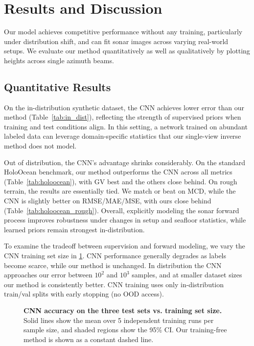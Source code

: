 \section{Results and Discussion}
\label{sec:results}

Our model achieves {competitive} performance without any training, {particularly under distribution shift}, and can fit sonar images across varying real-world setups. We evaluate our method quantitatively as well as qualitatively by plotting heights across single azimuth beams.

\subsection{Quantitative Results}
\label{sec:quantitative}
On the in-distribution synthetic dataset, the CNN achieves lower error than our method (Table~\ref{tab:in_dist}), reflecting the strength of supervised priors when training and test conditions align. In this setting, a network trained on abundant labeled data can leverage domain-specific statistics that our single-view inverse method does not model.

Out of distribution, the CNN’s advantage shrinks considerably. On the standard HoloOcean benchmark, our method outperforms the CNN across all metrics (Table~\ref{tab:holoocean}), with GV best and the others close behind. On rough terrain, the results are essentially tied. We match or beat on MCD, while the CNN is slightly better on RMSE/MAE/MSE, with ours close behind (Table~\ref{tab:holoocean_rough}). Overall, explicitly modeling the sonar forward process improves robustness under changes in setup and seafloor statistics, while learned priors remain strongest in-distribution.
    
To examine the tradeoff between supervision and forward modeling, we vary the CNN training set size in \cref{fig:cnn_logplot}. CNN performance generally degrades as labels become scarce, while our method is unchanged. In distribution the CNN approaches our error between \(10^2\) and \(10^3\) samples, and at smaller dataset sizes our method is consistently better. CNN training uses only in-distribution train/val splits with early stopping (no OOD access).

\begin{figure}
  \centering
  \resizebox{1.0\columnwidth}{!}{
    
  }
  \vspace{-0.2in}
  \caption{{\bf CNN accuracy on the three test sets vs. training set size.} Solid lines show the mean over 5 independent training runs per sample size, and shaded regions show the 95\% CI. Our training-free method is shown as a constant dashed line.\vspace{-0.15in}}
  \label{fig:cnn_logplot}
\end{figure}

